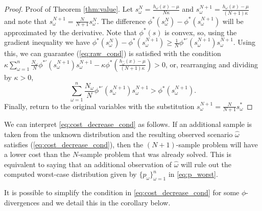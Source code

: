 \documentclass[opre,nonblindrev]{informs3} %
\begin{document}
\begin{proof}{\sc Proof of Theorem \ref{thm:value}.}
	Let $s^N_\omega = \frac{h_\omega(x) - \mu}{N\kappa}$ and $s^{N+1}_\omega = \frac{h_\omega(x) - \mu}{(N+1)\kappa}$ and note that $s^{N+1}_\omega = \tfrac{N}{N+1} s^N_\omega$.
	The difference $\phi^*(s^N_\omega) - \phi^*(s^{N+1}_\omega)$ will be approximated by the derivative.
Note that $\phi^*(s)$ is convex, so, using the gradient inequality we have $\phi^*(s^N_\omega) - \phi^*(s^{N+1}_\omega) \geq \frac{1}{N} \phi^{*\prime}(s^{N+1}_\omega) s^{N+1}_\omega$. 
	Using this, we can guarantee (\ref{eq:raw_cond}) is satisfied with the condition $\kappa \sum_{\omega=1}^n \frac{N_\omega}{N} \phi^{*\prime}(s^{N+1}_\omega) s^{N+1}_\omega - \kappa \phi^*\left(\frac{h_{\hat{\omega}}(x) - \mu}{(N+1)\kappa}\right) > 0$, or, rearranging and dividing by $\kappa > 0$,
	\begin{equation} \label{eq:main_value_derivation}
		\sum_{\omega=1}^n \frac{N_\omega}{N} \phi^{*\prime}(s^{N+1}_\omega) s^{N+1}_\omega > \phi^*(s^{N+1}_\omega).
	\end{equation}
	Finally, return to the original variables with the substitution $s^{N+1}_\omega = \frac{N}{N+1} s^*_\omega$
	\Halmos
\end{proof}

We can interpret \eqref{eq:cost_decrease_cond} as follows. If an additional sample is taken from the unknown distribution and the resulting observed scenario $\hat{\omega}$ satisfies (\ref{eq:cost_decrease_cond}), then the $(N+1)$-sample problem will have a lower cost than the $N$-sample problem that was already solved.
This is equivalent to saying that an additional observation of $\hat{\omega}$ will rule out the computed worst-case distribution given by $\{p_\omega\}_{\omega=1}^{n}$ in \eqref{eq:p_worst}.

It is possible to simplify the condition in \eqref{eq:cost_decrease_cond} for some $\phi$-divergences and we detail this in the corollary below. 
\end{document}
